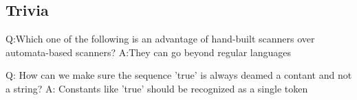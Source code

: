 \subsection{Trivia}
Q:Which one of the following is an advantage of hand-built scanners over automata-based
scanners? 
A:They can go beyond regular languages

Q: How can we make sure the sequence 'true' is always deamed a contant and not a string?
A: Constants like 'true' should be recognized as a single token